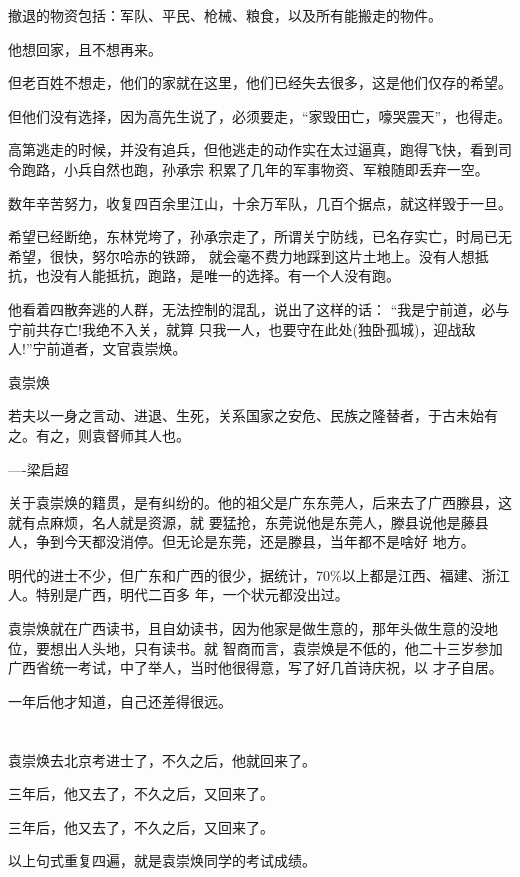 \documentclass[11pt,a4paper,onecolumn]{article}
\begin{document}
撤退的物资包括：军队、平民、枪械、粮食，以及所有能搬走的物件。

他想回家，且不想再来。

但老百姓不想走，他们的家就在这里，他们已经失去很多，这是他们仅存的希望。

但他们没有选择，因为高先生说了，必须要走，``家毁田亡，嚎哭震天''，也得走。

高第逃走的时候，并没有追兵，但他逃走的动作实在太过逼真，跑得飞快，看到司令跑路，小兵自然也跑，孙承宗
积累了几年的军事物资、军粮随即丢弃一空。

数年辛苦努力，收复四百余里江山，十余万军队，几百个据点，就这样毁于一旦。

希望已经断绝，东林党垮了，孙承宗走了，所谓关宁防线，已名存实亡，时局已无希望，很快，努尔哈赤的铁蹄，
就会毫不费力地踩到这片土地上。没有人想抵抗，也没有人能抵抗，跑路，是唯一的选择。有一个人没有跑。

他看着四散奔逃的人群，无法控制的混乱，说出了这样的话： ``我是宁前道，必与宁前共存亡!我绝不入关，就算
只我一人，也要守在此处(独卧孤城)，迎战敌人!''宁前道者，文官袁崇焕。

袁崇焕

若夫以一身之言动、进退、生死，关系国家之安危、民族之隆替者，于古未始有之。有之，则袁督师其人也。

----梁启超

关于袁崇焕的籍贯，是有纠纷的。他的祖父是广东东莞人，后来去了广西滕县，这就有点麻烦，名人就是资源，就
要猛抢，东莞说他是东莞人，滕县说他是藤县人，争到今天都没消停。但无论是东莞，还是滕县，当年都不是啥好
地方。

明代的进士不少，但广东和广西的很少，据统计，70\%以上都是江西、福建、浙江人。特别是广西，明代二百多
年，一个状元都没出过。

袁崇焕就在广西读书，且自幼读书，因为他家是做生意的，那年头做生意的没地位，要想出人头地，只有读书。就
智商而言，袁崇焕是不低的，他二十三岁参加广西省统一考试，中了举人，当时他很得意，写了好几首诗庆祝，以
才子自居。

一年后他才知道，自己还差得很远。

\section[\thesection]{}

袁崇焕去北京考进士了，不久之后，他就回来了。

三年后，他又去了，不久之后，又回来了。

三年后，他又去了，不久之后，又回来了。

以上句式重复四遍，就是袁崇焕同学的考试成绩。
\end{document}

